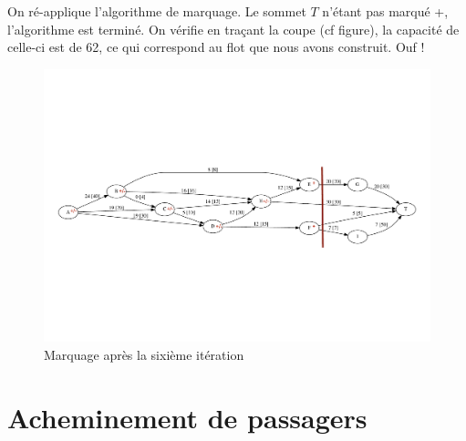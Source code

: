 \documentclass[paper=a4, fontsize=11pt]{scrartcl} %
\numberwithin{equation}{section} %
\numberwithin{figure}{section} %
\numberwithin{table}{section} %
\begin{document}
On ré-applique l'algorithme de marquage. Le sommet $T$ n'étant pas marqué +, l'algorithme est terminé. On vérifie en traçant la coupe (cf figure), la capacité de celle-ci est de 62, ce qui correspond au flot que nous avons construit. Ouf !

\begin{figure}[h]
\begin{center}
	\includegraphics[width=\textwidth]{figs/reseau-6m.pdf}
	\caption{Marquage après la sixième itération}
	\label{fig:res:6m}
\end{center}
\end{figure}


\clearpage

\section{Acheminement de passagers}


\end{document}
